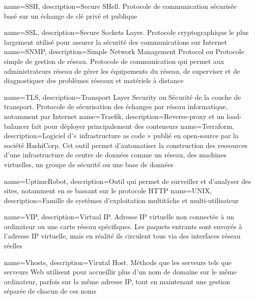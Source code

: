 {
    name=SSH,
    description={Secure SHell. Protocole de communication sécurisée basé sur un échange de clé privé et publique}
}

{
    name=SSL,
    description={Secure Sockets Layer. Protocole cryptographique le plus largement utilisé pour assurer la sécurité des communications sur Internet}
}
{
    name=SNMP,
    description={Simple Network Management Protocol ou Protocole simple de gestion de réseau. Protocole de communication qui permet aux administrateurs réseau de gérer les équipements du réseau, de superviser et de diagnostiquer des problèmes réseaux et matériels à distance}
}

{
    name=TLS,
    description={Transport Layer Security ou Sécurité de la couche de transport. Protocole de sécurisation des échanges par réseau informatique, notamment par Internet}
}
{
    name=Traefik,
    description={Reverse-proxy et un load-balancer fait pour déployer principalement des conteneurs}
}
{
    name=Terraform,
    description={Logiciel d'« infrastructure as code » publié en open-source par la société HashiCorp. Cet outil permet d'automatiser la construction des ressources d'une infrastructure de centre de données comme un réseau, des machines virtuelles, un groupe de sécurité ou une base de données}
}

{
    name=UptimeRobot,
    description={Outil qui permet de surveiller et d'analyser des sites, notamment en se bassant sur le protocole HTTP}
}
{
    name=UNIX,
    description={Famille de systèmes d'exploitation multitâche et multi-utilisateur}
}



{
    name=VIP,
    description={Virtual IP. Adresse IP virtuelle non connectée à un ordinateur ou une carte réseau spécifiques. Les paquets entrants sont envoyés à l'adresse IP virtuelle, mais en réalité ils circulent tous via des interfaces réseau réelles}
}

{
    name=Vhosts,
    description={Virutal Host. Méthode que les serveurs tels que serveurs Web utilisent pour accueillir plus d'un nom de domaine sur le même ordinateur, parfois sur la même adresse IP, tout en maintenant une gestion séparée de chacun de ces noms}
}

